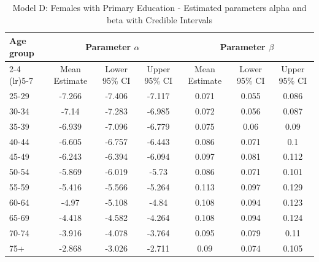 \begin{landscape}
\begin{table}[htbp]
\centering
\caption{Model D: Females with Primary Education - Estimated parameters alpha and beta  with Credible Intervals}
\label{tab:parameters_ab26}
\begin{tabular}{@{}lcccccc@{}}
\toprule
Age group & \multicolumn{3}{c}{Parameter \(\alpha\)} & \multicolumn{3}{c}{Parameter \(\beta\)} \\ 
\cmidrule(lr){2-4} \cmidrule(lr){5-7}
          & Mean Estimate & Lower 95\% CI & Upper 95\% CI & Mean Estimate & Lower 95\% CI & Upper 95\% CI \\ 
\midrule
25-29 & -7.266 & -7.406 & -7.117 & 0.071 & 0.055 & 0.086 \\
30-34 & -7.14 & -7.283 & -6.985 & 0.072 & 0.056 & 0.087 \\
35-39 & -6.939 & -7.096 & -6.779 & 0.075 & 0.06 & 0.09 \\
40-44 & -6.605 & -6.757 & -6.443 & 0.086 & 0.071 & 0.1 \\
45-49 & -6.243 & -6.394 & -6.094 & 0.097 & 0.081 & 0.112 \\
50-54 & -5.869 & -6.019 & -5.73 & 0.086 & 0.071 & 0.101 \\
55-59 & -5.416 & -5.566 & -5.264 & 0.113 & 0.097 & 0.129 \\
60-64 & -4.97 & -5.108 & -4.84 & 0.108 & 0.094 & 0.123 \\
65-69 & -4.418 & -4.582 & -4.264 & 0.108 & 0.094 & 0.124 \\
70-74 & -3.916 & -4.078 & -3.764 & 0.095 & 0.079 & 0.11 \\
75+ & -2.868 & -3.026 & -2.711 & 0.09 & 0.074 & 0.105 \\
\bottomrule
\end{tabular}
\end{table}
\end{landscape}